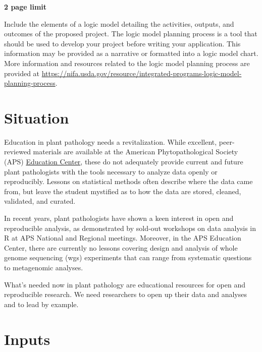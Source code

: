 \documentclass[12pt,letterpaper]{article}
\title{\ruleline{Logic Model}}
\begin{document}
\maketitle
\linenumbers

\textbf{2 page limit}

Include the elements of a logic model detailing the activities, outputs, and
outcomes of the proposed project. The logic model planning process is a tool
that should be used to develop your project before writing your application.
This information may be provided as a narrative or formatted into a logic model
chart. More information and resources related to the logic model planning
process are provided at
\url{https://nifa.usda.gov/resource/integrated-programs-logic-model-planning-process}.

\hline

\section{Situation}


Education in plant pathology needs a revitalization. While excellent, peer-
reviewed materials are available at the American Phytopathological Society (APS)
\href{http://www.apsnet.org/edcenter/Pages/default.aspx}{Education Center}, 
these do not adequately provide current and future plant pathologists with the
tools necessary to analyze data openly or reproducibly. Lessons on statistical
methods often describe where the data came from, but leave the student mystified
as to how the data are stored, cleaned, validated, and curated.

In recent years, plant pathologists have shown a keen interest in open and
reproducible analysis, as demonstrated by sold-out workshops on data analysis in
R at APS National and Regional meetings. Moreover, in the APS Education Center,
there are currently no lessons covering design and analysis of whole genome
sequencing (wgs) experiments that can range from systematic questions to
metagenomic analyses.

What's needed now in plant pathology are educational resources for open and
reproducible research. We need researchers to open up their data and analyses
and to lead by example.

\section{Inputs}
\end{document}
